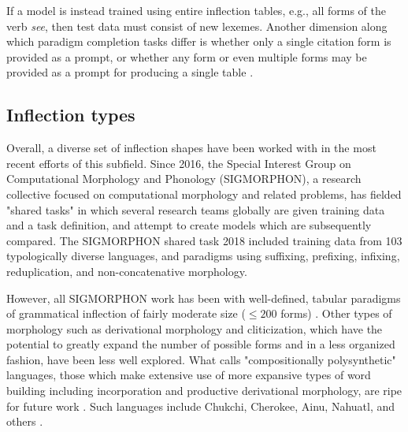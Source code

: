 If a model is instead trained using entire inflection tables, e.g., all forms of the verb \textit{see}, then test data must consist of new lexemes. Another dimension along which paradigm completion tasks differ is whether only a single citation form is provided as a prompt, or whether any form or even multiple forms may be provided as a prompt for producing a single table \parencite{Hulden2014} \parencite{Ahlberg2015} \parencite{Cotterell2017}.

\subsection{Inflection types}

Overall, a diverse set of inflection shapes have been worked with in the most recent efforts of this subfield. Since 2016, the Special Interest Group on Computational Morphology and Phonology (SIGMORPHON), a research collective focused on computational morphology and related problems, has fielded "shared tasks" in which several research teams globally are given training data and a task definition, and attempt to create models which are subsequently compared. The SIGMORPHON shared task 2018 included training data from 103 typologically diverse languages, and paradigms using suffixing, prefixing, infixing, reduplication, and non-concatenative morphology. 

However, all SIGMORPHON work has been with well-defined, tabular paradigms of grammatical inflection of fairly moderate size ($\leq 200$ forms) \parencite{Cotterell2018b}. Other types of morphology such as derivational morphology and cliticization, which have the potential to greatly expand the number of possible forms and in a less organized fashion, have been less well explored. What \cite{Mattissen2004} calls "compositionally polysynthetic" languages, those which make extensive use of more expansive types of word building including incorporation and productive derivational morphology, are ripe for future work \parencite{Cotterell2016}. Such languages include Chukchi, Cherokee, Ainu, Nahuatl, and others \parencite{Mattissen2004}.

